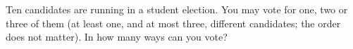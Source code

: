 Ten candidates are running in a student election. You may vote for one, two or three of them (at least one, and at most three, different candidates; the order does not matter). In how many ways can you vote?
